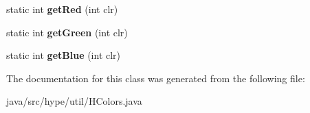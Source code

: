 \begin{DoxyCompactItemize}
\item 
\hypertarget{classhype_1_1util_1_1_h_colors_a959197861eca89ab4305080612fe1ba4}{static int {\bfseries get\-Red} (int clr)}\label{classhype_1_1util_1_1_h_colors_a959197861eca89ab4305080612fe1ba4}

\item 
\hypertarget{classhype_1_1util_1_1_h_colors_ac6ae0c6618fe56ce5cc8b509ef23c792}{static int {\bfseries get\-Green} (int clr)}\label{classhype_1_1util_1_1_h_colors_ac6ae0c6618fe56ce5cc8b509ef23c792}

\item 
\hypertarget{classhype_1_1util_1_1_h_colors_af356be3cc5ce2f711c5894dbb4083b56}{static int {\bfseries get\-Blue} (int clr)}\label{classhype_1_1util_1_1_h_colors_af356be3cc5ce2f711c5894dbb4083b56}

\end{DoxyCompactItemize}


The documentation for this class was generated from the following file\-:\begin{DoxyCompactItemize}
\item 
java/src/hype/util/H\-Colors.\-java\end{DoxyCompactItemize}
